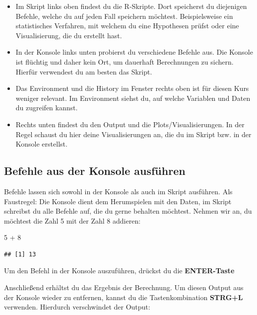 \documentclass[
]{book}
\newenvironment{Shaded}{\begin{snugshade}}{\end{snugshade}}
\newcommand{\DecValTok}[1]{\textcolor[rgb]{0.00,0.00,0.81}{#1}}
\newcommand{\SpecialCharTok}[1]{\textcolor[rgb]{0.00,0.00,0.00}{#1}}
\begin{document}
\begin{itemize}
\item
  Im Skript links oben findest du die R-Skripte. Dort speicherst du diejenigen Befehle, welche du auf jeden Fall speichern möchtest. Beispielsweise ein statistisches Verfahren, mit welchem du eine Hypothesen prüfst oder eine Visualisierung, die du erstellt hast.
\item
  In der Konsole links unten probierst du verschiedene Befehle aus. Die Konsole ist flüchtig und daher kein Ort, um dauerhaft Berechnungen zu sichern. Hierfür verwendest du am besten das Skript.
\item
  Das Environment und die History im Fenster rechts oben ist für diesen Kurs weniger relevant. Im Environment siehst du, auf welche Variablen und Daten du zugreifen kannst.
\item
  Rechts unten findest du den Output und die Plots/Visualisierungen. In der Regel schaust du hier deine Visualisierungen an, die du im Skript bzw. in der Konsole erstellst.
\end{itemize}

\hypertarget{befehle-aus-der-konsole-ausfuxfchren}{%
\subsection{Befehle aus der Konsole ausführen}\label{befehle-aus-der-konsole-ausfuxfchren}}

Befehle lassen sich sowohl in der Konsole als auch im Skript ausführen. Als Faustregel: Die Konsole dient dem Herumspielen mit den Daten, im Skript schreibst du alle Befehle auf, die du gerne behalten möchtest. Nehmen wir an, du möchtest die Zahl 5 mit der Zahl 8 addieren:

\begin{Shaded}
\begin{Highlighting}[]
\DecValTok{5} \SpecialCharTok{+} \DecValTok{8}
\end{Highlighting}
\end{Shaded}

\begin{verbatim}
## [1] 13
\end{verbatim}

Um den Befehl in der Konsole auszuführen, drückst du die \textbf{ENTER-Taste}

Anschließend erhältst du das Ergebnis der Berechnung. Um diesen Output aus der Konsole wieder zu entfernen, kannst du die Tastenkombination \textbf{STRG+L} verwenden. Hierdurch verschwindet der Output:
\end{document}
